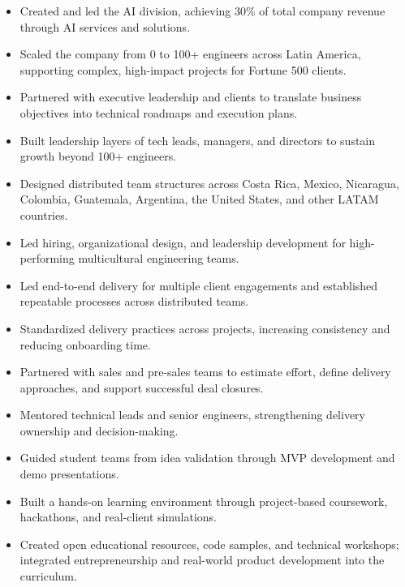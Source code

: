 \documentclass[8pt,letterpaper,withhyper]{altacv}
\begin{document}
\divider
{}
\begin{itemize}
\item Created and led the AI division, achieving 30\% of total company revenue through AI services and solutions.
\item Scaled the company from 0 to 100+ engineers across Latin America, supporting complex, high-impact projects for Fortune 500 clients.
\item Partnered with executive leadership and clients to translate business objectives into technical roadmaps and execution plans.
\item Built leadership layers of tech leads, managers, and directors to sustain growth beyond 100+ engineers.
\item Designed distributed team structures across Costa Rica, Mexico, Nicaragua, Colombia, Guatemala, Argentina, the United States, and other LATAM countries.
\item Led hiring, organizational design, and leadership development for high-performing multicultural engineering teams.
\end{itemize}

\divider
{}
\begin{itemize}
\item Led end-to-end delivery for multiple client engagements and established repeatable processes across distributed teams.
\item Standardized delivery practices across projects, increasing consistency and reducing onboarding time.
\item Partnered with sales and pre-sales teams to estimate effort, define delivery approaches, and support successful deal closures.
\item Mentored technical leads and senior engineers, strengthening delivery ownership and decision-making.
\end{itemize}

\divider
{}
\begin{itemize}
\item Guided student teams from idea validation through MVP development and demo presentations.
\item Built a hands-on learning environment through project-based coursework, hackathons, and real-client simulations.
\item Created open educational resources, code samples, and technical workshops; integrated entrepreneurship and real-world product development into the curriculum.
\end{itemize}
\end{document}
